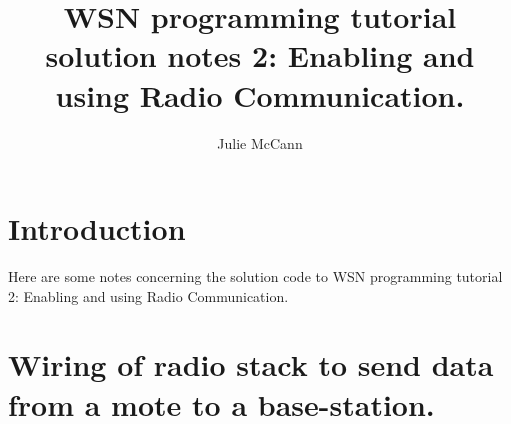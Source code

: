 \documentclass [a4] {article}
\author{Julie McCann}
\title{WSN programming tutorial solution notes 2: Enabling and using Radio Communication.}
\begin{document}
\maketitle

\section{Introduction}

Here are some notes concerning the solution code to WSN programming tutorial 2: Enabling and using Radio Communication. 

\section{Wiring of radio stack to send data from a mote to a base-station.}
\end{document}

